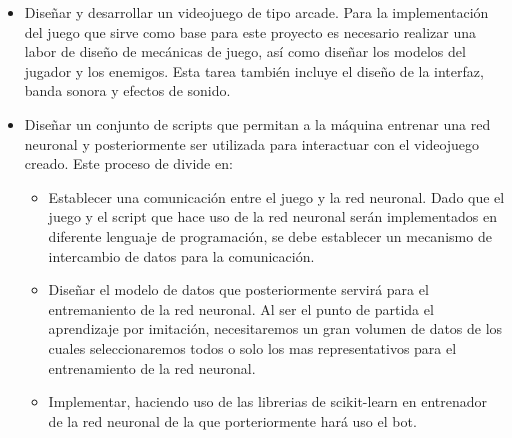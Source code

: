 
 
\begin{itemize}
    \item Diseñar y desarrollar un videojuego de tipo arcade. Para la implementación del juego que sirve como base para este proyecto es necesario realizar una labor de diseño de mecánicas de juego, así como diseñar los modelos del jugador y los enemigos. Esta tarea también incluye el diseño de la interfaz, banda sonora y efectos de sonido. 
    
    \item Diseñar un conjunto de scripts que permitan a la máquina entrenar una red neuronal y posteriormente ser utilizada para interactuar con el videojuego creado. Este proceso de divide en:
    \begin{itemize}
        \item Establecer una comunicación entre el juego y la red neuronal. Dado que el juego y el script que hace uso de la red neuronal serán implementados en diferente lenguaje de programación, se debe establecer un mecanismo de intercambio de datos para la comunicación.
        \item Diseñar el modelo de datos que posteriormente servirá para el entremaniento de la red neuronal. Al ser el punto de partida el aprendizaje por imitación, necesitaremos un gran volumen de datos de los cuales seleccionaremos todos o solo los mas representativos para el entrenamiento de la red neuronal.
        \item Implementar, haciendo uso de las librerias de scikit-learn en entrenador de la red neuronal de la que porteriormente hará uso el bot.
    \end{itemize}
\end{itemize}
